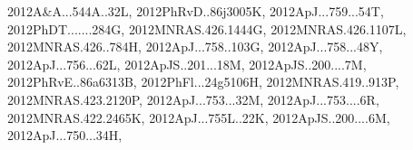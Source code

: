 \documentclass[12pt]{article}
\begin{document}
\begin{description}
{2012A&A...544A..32L,%
2012PhRvD..86j3005K,%
2012ApJ...759...54T,%
2012PhDT.......284G,%
2012MNRAS.426.1444G,%
2012MNRAS.426.1107L,%
2012MNRAS.426..784H,%
2012ApJ...758..103G,%
2012ApJ...758...48Y,%
2012ApJ...756...62L,%
2012ApJS..201...18M,%
2012ApJS..200....7M,%
2012PhRvE..86a6313B,%
2012PhFl...24g5106H,%
2012MNRAS.419..913P,%
2012MNRAS.423.2120P,%
2012ApJ...753...32M,%
2012ApJ...753....6R,%
2012MNRAS.422.2465K,%
2012ApJ...755L..22K,%
2012ApJS..200....6M,%
2012ApJ...750...34H,%
}
\end{description}
\end{document}

